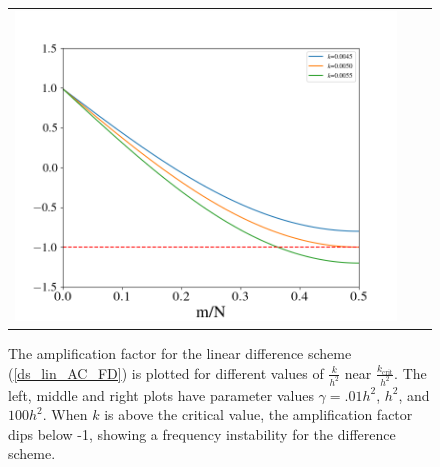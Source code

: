 \documentclass[12pt, reqno]{report}
\theoremstyle{definition}
\theoremstyle{remark}
\begin{document}
\begin{figure}[H]
\begin{tabular}{ccc}
        \includegraphics[width = \ampwidth]{media_paper/ga100_AC_FD.png}
    \end{tabular}

    \caption{The amplification factor for the linear difference scheme (\ref{ds_lin_AC_FD}) is plotted for different values of $\frac{k}{h^2}$ near $\frac{k_\text{crit}}{h^2}$. The left, middle and right plots have parameter values $\gamma=.01h^2$, $h^2$, and $100h^2$. When $k$ is above the critical value, the amplification factor dips below -1, showing a frequency instability for the difference scheme.}
    \label{fg_AC_amp}
\end{figure}
	
\end{document}

